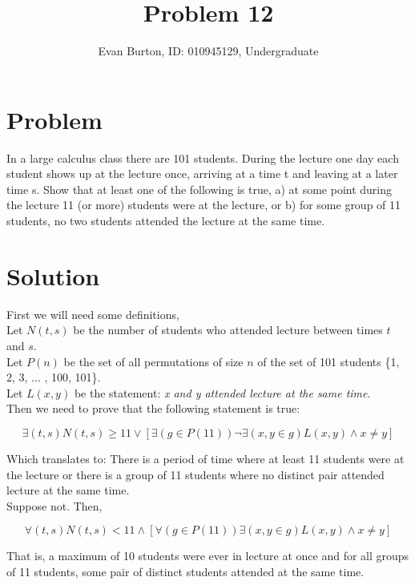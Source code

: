 \documentclass[]{article}
\title{Problem 12}
\author{Evan Burton, ID: 010945129, Undergraduate}
\begin{document}
\maketitle

\section{Problem}
In a large calculus class there are 101 students. During the lecture one day each student shows up at the lecture once, arriving at a time t and leaving at a later time s.  Show that at least one of the following is true, a) at some point during the lecture 11 (or more) students were at the lecture, or b) for some group of 11 students, no two students attended the lecture at the same time.

\section{Solution}
First we will need some definitions,\\

Let $N(t,s)$ be the number of students who attended lecture between times \indent$t$ and $s$.\\

Let $P(n)$ be the set of all permutations of size $n$ of the set of 101 students \indent\{1, 2, 3, $\ldots$ , 100, 101\}.\\

Let $L(x,y)$ be the statement: \textit{x and y attended lecture at the same time}.\\

Then we need to prove that the following statement is true:

$$\exists(t,s) N(t,s) \geq 11 \lor [\exists(g\in P(11)) \lnot \exists(x,y\in g) L(x,y)\land x\neq y]$$

Which translates to: There is a period of time where at least 11 students were at the lecture or there is a group of 11 students where no distinct pair attended lecture at the same time.\\

Suppose not. Then,

$$\forall(t,s) N(t,s) < 11 \land [\forall(g\in P(11)) \exists(x,y\in g) L(x,y) \land x\neq y]$$

That is, a maximum of 10 students were ever in lecture at once and for all groups of 11 students, some pair of distinct students attended at the same time.\\
\end{document}
